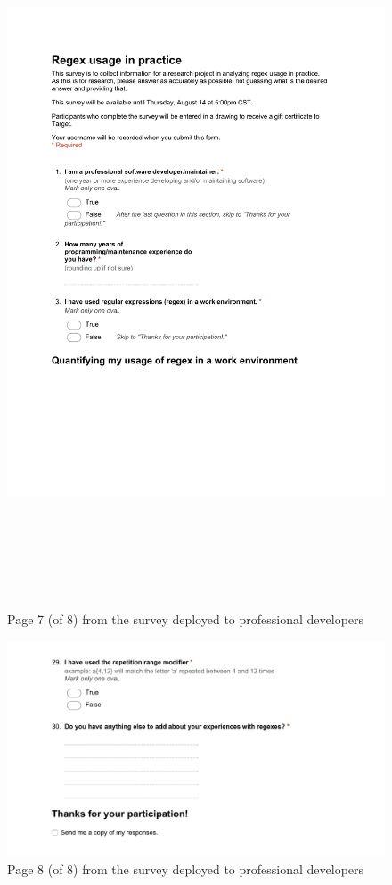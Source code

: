 \begin{figure}[!htbp]
   \centering
       \includegraphics[page=7, height=21cm,keepaspectratio]{nontex/appendix/regexUsageInPracticeSurvey}
 \caption{Page 7 (of 8) from the survey deployed to professional developers}
 \label{fig:surveyPDF7}
\end{figure}
\begin{figure}[!htbp]
   \centering
       \includegraphics[page=1, width=\textwidth,keepaspectratio]{nontex/appendix/regexUsageInPracticeSurveyLastPage}
 \caption{Page 8 (of 8) from the survey deployed to professional developers}
 \label{fig:surveyPDF8}
\end{figure}

